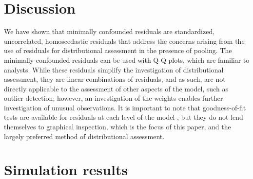 \documentclass[12pt]{article} %
\newcommand{\trans}{\ensuremath{^\prime}}
\begin{document}
\section{Discussion}
We have shown that minimally confounded residuals are standardized, uncorrelated, homoscedastic residuals that address the concerns arising from the use of residuals for distributional assessment in the presence of pooling. The minimally confounded residuals can be used with Q-Q plots, which are familiar to analysts. While these residuals simplify the investigation of distributional assessment, they are linear combinations of residuals, and as such, are not directly applicable to the assessment of other aspects of the model, such as outlier detection; however, an investigation of the weights enables further investigation of unusual observations.
%
%
%
%
It is important to note that goodness-of-fit tests are available for residuals at each level of the model \citep{Jiang:2001up}, but they do not lend themselves to graphical inspection, which is the focus of this paper, and the largely preferred method of distributional assessment. 


\section*{Simulation results}


\end{document}
